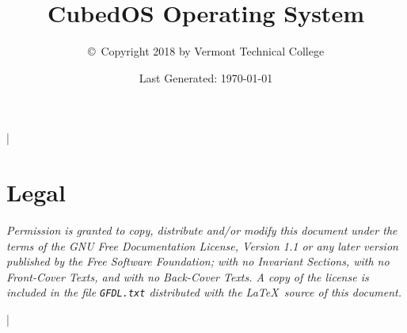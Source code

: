 \documentclass{scrreprt}
\begin{document}
\title{CubedOS Operating System}
\author{\copyright\ Copyright 2018 by Vermont Technical College}
\date{Last Generated: \today}
\maketitle

\tableofcontents

\lstMakeShortInline|

\section*{Legal}
\label{sec:legal}

\textit{Permission is granted to copy, distribute and/or modify this document under the terms of
  the GNU Free Documentation License, Version 1.1 or any later version published by the Free
  Software Foundation; with no Invariant Sections, with no Front-Cover Texts, and with no
  Back-Cover Texts. A copy of the license is included in the file \texttt{GFDL.txt} distributed
  with the \LaTeX\ source of this document.}






\newpage

\newpage


\lstDeleteShortInline|




\end{document}

